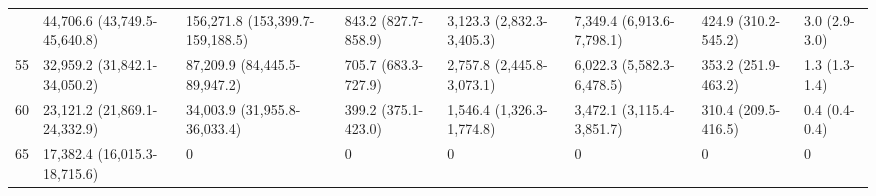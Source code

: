 \begin{table}
\begin{tabular}[t]{rlllllll}
\addlinespace
50 & 44,706.6 (43,749.5-45,640.8) & 156,271.8 (153,399.7-159,188.5) & 843.2 (827.7-858.9) & 3,123.3 (2,832.3-3,405.3) & 7,349.4 (6,913.6-7,798.1) & 424.9 (310.2-545.2) & 3.0 (2.9-3.0)\\
55 & 32,959.2 (31,842.1-34,050.2) & 87,209.9 (84,445.5-89,947.2) & 705.7 (683.3-727.9) & 2,757.8 (2,445.8-3,073.1) & 6,022.3 (5,582.3-6,478.5) & 353.2 (251.9-463.2) & 1.3 (1.3-1.4)\\
60 & 23,121.2 (21,869.1-24,332.9) & 34,003.9 (31,955.8-36,033.4) & 399.2 (375.1-423.0) & 1,546.4 (1,326.3-1,774.8) & 3,472.1 (3,115.4-3,851.7) & 310.4 (209.5-416.5) & 0.4 (0.4-0.4)\\
65 & 17,382.4 (16,015.3-18,715.6) & 0 & 0 & 0 & 0 & 0 & 0\\
\bottomrule
\end{tabular}
\end{table}
